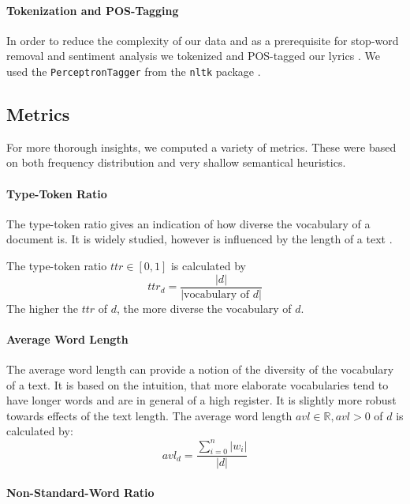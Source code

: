 \documentclass[11pt,a4paper]{article}
\begin{document}
\paragraph{Tokenization and POS-Tagging}

In order to reduce the complexity of our data and as a prerequisite for stop-word removal and sentiment analysis we tokenized and POS-tagged our lyrics \cite{jurafsky2014speech}. We used the \texttt{PerceptronTagger} from the \texttt{nltk} package \cite{bird_natural_2009}.

\subsection{Metrics}\label{sec:metrics}

For more thorough insights, we computed a variety of metrics. These were based on both frequency distribution and very shallow semantical heuristics.

\paragraph{Type-Token Ratio}


The type-token ratio gives an indication of how diverse the vocabulary of a document is. It is widely studied, however is influenced by the length of a text \cite{kettunen_type_2014}. 

The type-token ratio $ttr \in [0,1]$ is calculated by 
\begin{equation}
	ttr_{d} = \frac{|d|}{|\text{vocabulary of }d|}
\end{equation}
The higher the $ttr$ of $d$, the more diverse the vocabulary of $d$. 

\paragraph{Average Word Length}

The average word length can provide a notion of the diversity of the vocabulary of a text. It is based on the intuition, that more elaborate vocabularies tend to have longer words and are in general of a high register. It is slightly more robust towards effects of the text length. The average word length $avl \in \mathbb{R}, avl > 0$ of $d$ is calculated by:
\begin{equation}
	avl_{d} = \frac{\sum_{i=0}^n |w_i|}{|d|}
\end{equation} 

\paragraph{Non-Standard-Word Ratio}
\end{document}
